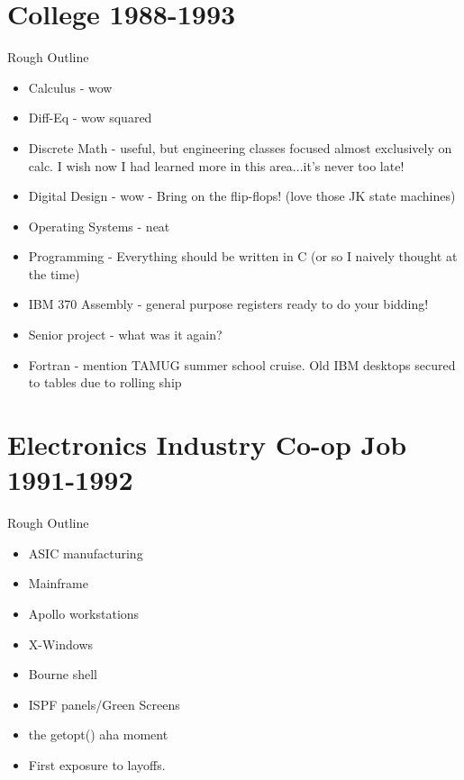 \documentclass[12pt]{report}
\begin{document}
\section{College 1988-1993}
	Rough Outline
	\begin{itemize}
	\item Calculus - wow
	\item Diff-Eq - wow squared
	\item Discrete Math - useful, but engineering classes focused almost exclusively on calc. I wish now I had 
	learned more in this area...it's never too late!
	\item Digital Design - wow - Bring on the flip-flops! (love those JK state machines)
	\item Operating Systems - neat
	\item Programming - Everything should be written in C (or so I naively thought at the time)
	\item IBM 370 Assembly - general purpose registers ready to do your bidding!
	\item Senior project - what was it again?
	\item Fortran - mention TAMUG summer school cruise. Old IBM desktops secured to tables due to rolling ship
	\end{itemize}

\section{Electronics Industry Co-op Job 1991-1992}
	Rough Outline
	\begin{itemize}
	\item ASIC manufacturing
	\item Mainframe
	\item Apollo workstations
	\item X-Windows
	\item Bourne shell
        \item ISPF panels/Green Screens
	\item the getopt() aha moment
        \item First exposure to layoffs.
        
	\end{itemize}
	
\end{document}
